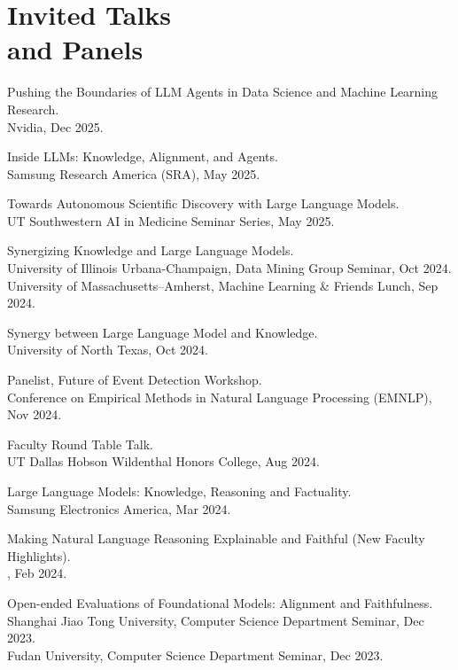 \section{Invited Talks \\ and Panels}

    \noindent Pushing the Boundaries of LLM Agents in Data Science and Machine Learning Research. \\
    \indent Nvidia, Dec 2025.

    \noindent Inside LLMs: Knowledge, Alignment, and Agents. \\
    \indent Samsung Research America (SRA), May 2025.

    \noindent Towards Autonomous Scientific Discovery with Large Language Models. \\
    \indent UT Southwestern AI in Medicine Seminar Series, May 2025.

    \noindent Synergizing Knowledge and Large Language Models. \\
    \indent University of Illinois Urbana-Champaign, Data Mining Group Seminar, Oct 2024. \\
    \indent University of Massachusetts--Amherst, Machine Learning \& Friends Lunch, Sep 2024.

    \noindent Synergy between Large Language Model and Knowledge. \\
    \indent University of North Texas, Oct 2024.

    \noindent Panelist, Future of Event Detection Workshop. \\
    \indent Conference on Empirical Methods in Natural Language Processing (EMNLP), Nov 2024.

    \noindent Faculty Round Table Talk. \\
    \indent UT Dallas Hobson Wildenthal Honors College, Aug 2024.

    \noindent Large Language Models: Knowledge, Reasoning and Factuality. \\
    \indent Samsung Electronics America, Mar 2024.

    \noindent Making Natural Language Reasoning Explainable and Faithful (New Faculty Highlights). \\
    \indent \AAAI, Feb 2024.

    \noindent Open-ended Evaluations of Foundational Models: Alignment and Faithfulness. \\
    \indent Shanghai Jiao Tong University, Computer Science Department Seminar, Dec 2023. \\
    \indent Fudan University, Computer Science Department Seminar, Dec 2023.

